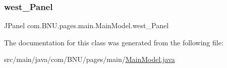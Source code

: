 \subsubsection{\texorpdfstring{west\+\_\+\+Panel}{west\_Panel}}
{\footnotesize\ttfamily J\+Panel com.\+B\+N\+U.\+pages.\+main.\+Main\+Model.\+west\+\_\+\+Panel\hspace{0.3cm}{\ttfamily [private]}}



The documentation for this class was generated from the following file\+:\begin{DoxyCompactItemize}
\item 
src/main/java/com/\+B\+N\+U/pages/main/\mbox{\hyperlink{_main_model_8java}{Main\+Model.\+java}}\end{DoxyCompactItemize}
